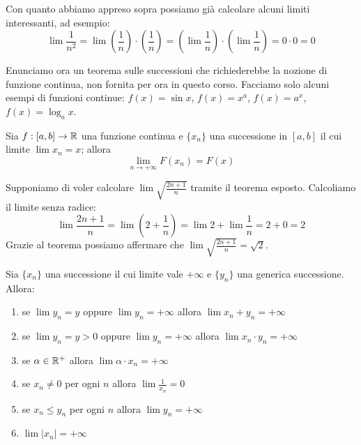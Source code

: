 Con quanto abbiamo appreso sopra possiamo già calcolare alcuni limiti interessanti, ad esempio:
\begin{equation*}
\lim \frac{1}{n^2} = \lim \left(\frac{1}{n}\right)\cdot\left(\frac{1}{n}\right) = \left(\lim \frac{1}{n}\right)\cdot\left(\lim \frac{1}{n}\right) = 0 \cdot 0 = 0
\end{equation*}

Enunciamo ora un teorema sulle successioni che richiederebbe la nozione di funzione continua, non fornita per ora in questo corso. Facciamo solo alcuni esempi di funzioni continue: $f(x) = \sin x$, $f(x) = x^a$, $f(x) = a^x$, $f(x)=\log_a x$.
\begin{theorem}
Sia $f: [a, b] \rightarrow \mathbb R$ una funzione continua e $\{x_n\}$ una successione in $[a,b]$ il cui limite $\lim x_n = x$; allora 
\begin{equation*}
\lim_{n \to +\infty} F(x_n) = F(x)
\end{equation*}
\end{theorem}

Supponiamo di voler calcolare $\lim \sqrt{\frac{2n+1}{n}}$ tramite il teorema esposto. Calcoliamo il limite senza radice:
\begin{equation*}
\lim \frac{2n+1}{n} = \lim \left(2 + \frac{1}{n}\right) = \lim 2 + \lim \frac{1}{n} = 2 + 0 = 2
\end{equation*}
Grazie al teorema possiamo affermare che $\lim \sqrt{\frac{2n+1}{n}} = \sqrt{2}$.

\begin{theorem}
Sia $\{x_n\}$ una successione il cui limite vale $+\infty$ e $\{y_n\}$ una generica successione. Allora:
\begin{enumerate}
\item se $\lim y_n = y$ oppure $\lim y_n = +\infty$ allora $\lim x_n + y_n = +\infty$
\item se $\lim y_n = y > 0$ oppure $\lim y_n = +\infty$ allora $\lim x_n\cdot y_n = +\infty$
\item se $\alpha \in \mathbb R^+$ allora $\lim \alpha \cdot x_n = +\infty$
\item se $x_n \neq 0$ per ogni $n$ allora $\lim \frac{1}{x_n} = 0$
\item se $x_n \le y_n$ per ogni $n$ allora $\lim y_n = +\infty$
\item $\lim|x_n| = +\infty$
\end{enumerate}
\end{theorem}